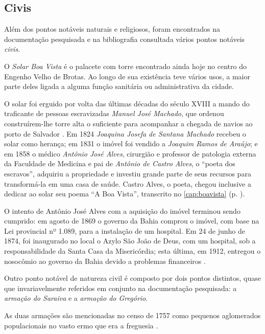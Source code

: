 \subsection{Civis}\label{subsec:pontciv}

Além dos pontos notáveis naturais e religiosos, foram encontrados na documentação pesquisada e na bibliografia consultada vários pontos notáveis \textit{civis}.

O \textit{Solar Boa Vista} é o palacete com torre encontrado ainda hoje no centro do Engenho Velho de Brotas. Ao longo de sua existência teve vários usos, a maior parte deles ligada a alguma função sanitária ou administrativa da cidade.

O solar foi erguido por volta das últimas décadas do século XVIII a mando do traficante de pessoas escravizadas \textit{Manuel José Machado}, que ordenou construírem-lhe torre alta o suficiente para acompanhar a chegada de navios ao porto de Salvador \cite[p.~127]{mattos_panorama_2011}. Em 1824 \textit{Joaquina Josefa de Santana Machado} recebeu o solar como herança; em 1831 o imóvel foi vendido a \textit{Joaquim Ramos de Araújo}; e em 1858 o médico \textit{Antônio José Alves}, cirurgião e professor de patologia externa da Faculdade de Medicina e pai de \textit{Antônio de Castro Alves}, o ``poeta dos escravos'', adquiriu a propriedade e investiu grande parte de seus recursos para transformá-la em uma casa de saúde. Castro Alves, o poeta, chegou inclusive a dedicar ao solar seu poema ``A Boa Vista'', transcrito no \autoref{cap:boavista} (p. \pageref{cap:boavista}).

O intento de Antônio José Alves com a aquisição do imóvel terminou sendo cumprido: em agosto de 1869 o governo da Bahia comprou o imóvel, com base na Lei provincial nº 1.089, para a instalação de um hospital. Em 24 de junho de 1874, foi inaugurado no local o Azylo São João de Deus, com um hospital, sob a responsabilidade da Santa Casa da Misericórdia; esta última, em 1912, entregou o nosocômio ao governo da Bahia devido a problemas financeiros \cite{jacobina_asylo_2001}.

Outro ponto notável de natureza civil é composto por dois pontos distintos, quase que invariavelmente referidos em conjunto na documentação pesquisada: a \textit{armação do Saraiva} e a \textit{armação do Gregório}.

As duas armações são mencionadas no censo de 1757 como pequenos aglomerados populacionais no vasto ermo que era a freguesia \cite[p.~183]{castralmeida_ultramar_1908}.

